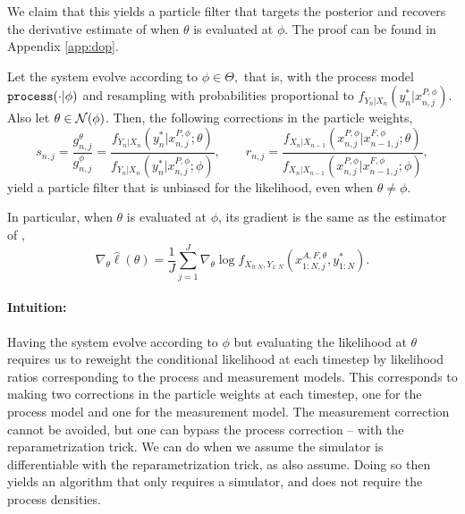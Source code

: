 \documentclass{article}
\begin{document}
We claim that this yields a particle filter that targets the posterior and recovers the derivative estimate of \citet{poyiadjis11, scibior2021dpf} when $\theta$ is evaluated at $\phi$. The proof can be found in Appendix \ref{app:dop}. 


\begin{prop}
    \label{prop:dop-correctness}

    Let the system evolve according to $\phi \in \Theta,$ that is, with the process model $\texttt{process}(\cdot | \phi)$ and resampling with probabilities proportional to $f_{Y_n|X_n}(y_n^* | x_{n,j}^{P,\phi})$. Also let $\theta \in {\mathcal{N}}(\phi)$. Then, the following corrections in the particle weights,
    \begin{equation}
    s_{n,j}=\frac{g_{n,j}^\theta}{g_{n,j}^{\phi}}=\frac{f_{Y_n|X_n}(y_n^*|x_{n,j}^{P, \phi}; \theta)}{f_{Y_n|X_n}(y_n^*|x_{n,j}^{P,\phi}; \phi)}, \qquad r_{n,j}=\frac{f_{X_n|X_{n-1}}(x_{n,j}^{P, \phi}|x_{n-1,j}^{F, \phi}; \theta)}{f_{X_n|X_{n-1}}(x_{n,j}^{P, \phi}|x_{n-1,j}^{F, \phi}; \phi)},
    \end{equation}
    yield a particle filter that is unbiased for the likelihood, even when $\theta \neq \phi$. 
    
    In particular, when $\theta$ is evaluated at $\phi$, its gradient is the same as the estimator of \citet{poyiadjis11},
    \begin{equation}
        \nabla_\theta \hat\ell(\theta) = \frac{1}{J}\sum_{j=1}^J \nabla_\theta \log f_{X_{0:N}, Y_{1:N}}(x_{1:N,j}^{A, F,\theta}, y_{1:N}^*).
    \end{equation}
\end{prop}

\paragraph{Intuition:} Having the system evolve according to $\phi$ but evaluating the likelihood at $\theta$ requires us to reweight the conditional likelihood at each timestep by likelihood ratios corresponding to the process and measurement models. This corresponds to making two corrections in the particle weights at each timestep, one for the process model and one for the measurement model. The measurement correction cannot be avoided, but one can bypass the process correction -- with the reparametrization trick. We can do when we assume the simulator is differentiable with the reparametrization trick, as \cite{corenflos21} also assume. Doing so then yields an algorithm that only requires a simulator, and does not require the process densities. 
\end{document}
